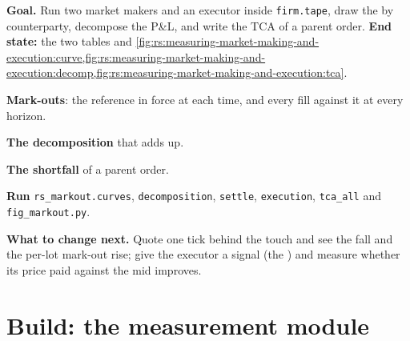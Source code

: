 \begin{tutorial}
\textbf{Goal.} Run two market makers and an executor inside \texttt{firm.tape}, draw the  by counterparty, decompose the P\&L, and write the
TCA of a parent order. \textbf{End state:} the two tables and
\cref{fig:rs:measuring-market-making-and-execution:curve,fig:rs:measuring-market-making-and-execution:decomp,fig:rs:measuring-market-making-and-execution:tca}.
\begin{tutsteps}
\item \textbf{Mark-outs}: the reference in force at each time, and every fill against it at every horizon.
\label{lst:rs:measuring-market-making-and-execution:markouts}
\item \textbf{The decomposition} that adds up.
\label{lst:rs:measuring-market-making-and-execution:decompose}
\item \textbf{The shortfall} of a parent order.
\label{lst:rs:measuring-market-making-and-execution:shortfall}
\item \textbf{Run} \texttt{rs\_markout.curves}, \texttt{decomposition}, \texttt{settle}, \texttt{execution}, \texttt{tca\_all} and \texttt{fig\_markout.py}.
\end{tutsteps}
\textbf{What to change next.} Quote one tick behind the touch and see the  fall and the per-lot mark-out rise; give the executor a signal (the
) and measure whether its price paid against the mid improves.
\end{tutorial}

\section{Build: the measurement module}\label{bld:rs:measuring-market-making-and-execution:markout}

